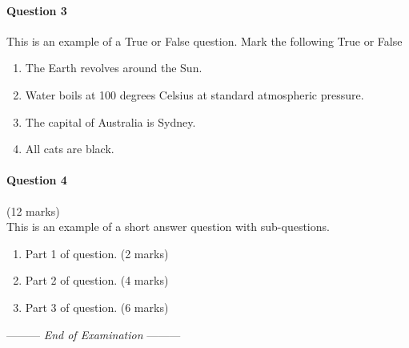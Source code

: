 \documentclass[a4paper,12pt,fleqn]{article}
\newcommand{\lastwords}{End of Examination}
\begin{document}
\newpage
\paragraph{\textbf{Question 3}}
This is an example of a True or False question. Mark the following True or False
\begin{enumerate}
    \item \underline{\hspace{0.5cm}} The Earth revolves around the Sun.
    \item \underline{\hspace{0.5cm}} Water boils at 100 degrees Celsius at standard atmospheric pressure.
    \item \underline{\hspace{0.5cm}} The capital of Australia is Sydney.
    \item \underline{\hspace{0.5cm}} All cats are black.
\end{enumerate}

\newpage
\paragraph{\textbf{Question 4}}\hfill (12 marks)\\
This is an example of a short answer question with sub-questions.
\begin{enumerate}
    \item Part 1 of question. \hfill (2 marks)
    \item Part 2 of question. \hfill (4 marks)
    \item Part 3 of question. \hfill (6 marks)
\end{enumerate}



\begin{center}
\vspace{3cm}
--------- \textit{\lastwords} ---------
\end{center}


\label{finalpage}
\end{document}
